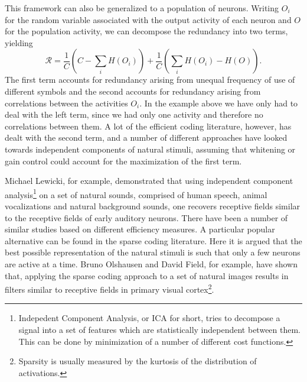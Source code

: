 This framework can also be generalized to a population of neurons. Writing $O_i$ for the random variable associated with the output activity of each neuron and $O$ for the population activity, we can decompose the redundancy into two terms, yielding
$$
\mathcal{R} = \frac{1}{C} \left(C - \sum_i H(O_i) \right) + \frac{1}{C}\left(\sum_i H(O_i) -H(O)\right).
$$
The first term accounts for redundancy arising from unequal frequency of use of different symbols and the second accounts for redundancy arising from correlations between the activities $O_i$. In the example above we have only had to deal with the left term, since we had only one activity and therefore no correlations between them. A lot of the efficient coding literature, however, has dealt with the second term, and a number of different approaches have looked towards independent components of natural stimuli, assuming that whitening or gain control could account for the maximization of the first term.\par
Michael Lewicki\cite{Lewicki2002}, for example, demonstrated that using independent component analysis\footnote{Indepedent Component Analysis, or ICA for short, tries to decompose a signal into a set of features which are statistically independent between them. This can be done by minimization of a number of different cost functions.} on a set of natural sounds, comprised of human speech, animal vocalizations and natural background sounds, one recovers receptive fields similar to the receptive fields of early auditory neurons. There have been a number of similar studies based on different efficiency measures. A particular popular alternative can be found in the sparse coding literature. Here it is argued that the best possible representation of the natural stimuli is such that only a few neurons are active at a time. Bruno Olshausen and David Field\cite{Olshausen1996}, for example, have shown that, applying the sparse coding approach to a set of natural images results in filters similar to receptive fields in primary visual cortex\footnote{Sparsity is usually measured by the kurtosis of the distribution of activations.}.\par
